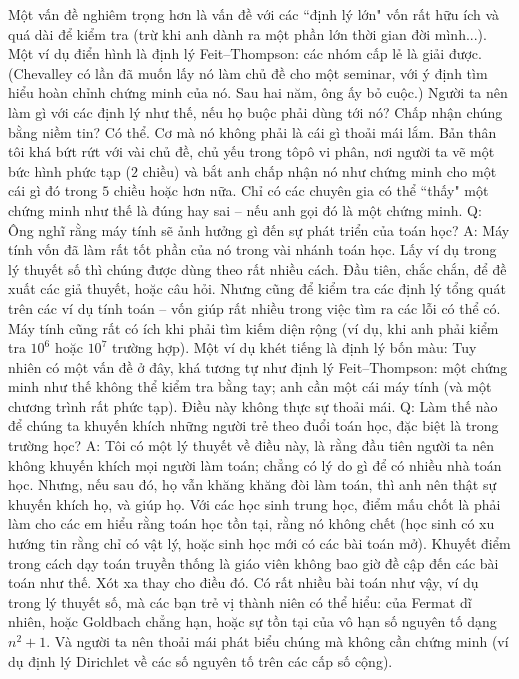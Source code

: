 \begin{multicols}{2}
	\vskip 0.1cm
	Một vấn đề nghiêm trọng hơn là vấn đề với các ``định lý lớn" vốn rất hữu ích và quá dài để kiểm tra (trừ khi anh dành ra một phần lớn thời gian đời mình...). Một ví dụ điển hình là định lý Feit--Thompson: các nhóm cấp lẻ là giải được.
	(Chevalley có lần đã muốn lấy nó làm chủ đề cho một seminar, với ý định tìm hiểu hoàn chỉnh chứng minh của nó. Sau hai năm, ông ấy bỏ cuộc.) Người ta nên làm gì với các định lý như thế, nếu họ buộc phải dùng tới nó? Chấp nhận chúng bằng niềm tin? Có thể. Cơ mà nó không phải là cái gì thoải mái lắm.
	\vskip 0.1cm
	Bản thân tôi khá bứt rứt với vài chủ đề, chủ yếu trong tôpô vi phân, nơi người ta vẽ một bức hình phức tạp ($2$ chiều) và bắt anh chấp nhận nó như chứng minh cho một cái gì đó trong $5$ chiều hoặc hơn nữa. Chỉ có các chuyên gia có thể ``thấy" một chứng minh như thế là đúng hay sai -- nếu anh gọi đó là một chứng minh. 
	\vskip 0.1cm
	Q: Ông nghĩ rằng máy tính sẽ ảnh hưởng gì đến sự phát triển của toán học?
	\vskip 0.1cm
	A: Máy tính vốn đã làm rất tốt phần của nó trong vài nhánh toán học. Lấy ví dụ trong lý thuyết số thì chúng được dùng theo rất nhiều cách. Đầu tiên, chắc chắn, để đề xuất các giả thuyết, hoặc câu hỏi. Nhưng cũng để kiểm tra các định lý tổng quát trên các ví dụ tính toán -- vốn giúp rất nhiều trong việc tìm ra các lỗi có thể có. 
	\vskip 0.1cm
	Máy tính cũng rất có ích khi phải tìm kiếm diện rộng (ví dụ, khi anh phải kiểm tra $10^6$ hoặc $10^7$ trường hợp). Một ví dụ khét tiếng là định lý bốn màu: Tuy nhiên có một vấn đề ở đây, khá tương tự như định lý Feit--Thompson: một chứng minh như thế không thể kiểm tra bằng tay; anh cần một cái máy tính (và một chương trình rất phức tạp). Điều này không thực sự thoải mái. 
	\vskip 0.1cm
	Q: Làm thế nào để chúng ta khuyến khích những người trẻ theo đuổi toán học, đặc biệt là trong trường học?
	\vskip 0.1cm
	A: Tôi có một lý thuyết về điều này, là rằng đầu tiên người ta nên không khuyến khích mọi người làm toán; chẳng có lý do gì để có nhiều nhà toán học. Nhưng, nếu sau đó, họ vẫn khăng khăng đòi làm toán, thì anh nên thật sự khuyến khích họ, và giúp họ.
	\vskip 0.1cm
	Với các học sinh trung học, điểm mấu chốt là phải làm cho các em hiểu rằng toán học tồn tại, rằng nó không chết (học sinh có xu hướng tin rằng chỉ có vật lý, hoặc sinh học mới có các bài toán mở). Khuyết điểm trong cách dạy toán truyền thống là giáo viên không bao giờ đề cập đến các bài toán như thế. Xót xa thay cho điều đó. Có rất nhiều bài toán như vậy, ví dụ trong lý thuyết số, mà các bạn trẻ vị thành niên có thể hiểu: của Fermat dĩ nhiên, hoặc Goldbach chẳng hạn, hoặc sự tồn tại của vô hạn số nguyên tố dạng $n^2+1$. Và người ta nên thoải mái phát biểu chúng mà không cần chứng minh (ví dụ định lý Dirichlet về các số nguyên tố trên các cấp số cộng). 

\end{multicols}
